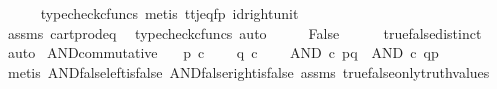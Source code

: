 \begin{isabellebody}
\ \ \ \ \isamarkupfalse%
\ {\isacharparenleft}{\kern0pt}typecheck{\isacharunderscore}{\kern0pt}cfuncs{\isacharcomma}{\kern0pt}\ metis\ tt{\isacharunderscore}{\kern0pt}j{\isacharunderscore}{\kern0pt}eq{\isacharunderscore}{\kern0pt}fp\ id{\isacharunderscore}{\kern0pt}right{\isacharunderscore}{\kern0pt}unit{}{\isacharparenright}{\kern0pt}\isanewline
\ \ \isamarkupfalse%
\ \isamarkupfalse%
\ {\isachardoublequoteopen}{\isasymt}\ {\isacharequal}{\kern0pt}\ {\isasymf}{\isachardoublequoteclose}\isanewline
\ \ \ \ \isamarkupfalse%
\ assms\ cart{\isacharunderscore}{\kern0pt}prod{\isacharunderscore}{\kern0pt}eq{}\ \isamarkupfalse%
\ {\isacharparenleft}{\kern0pt}typecheck{\isacharunderscore}{\kern0pt}cfuncs{\isacharcomma}{\kern0pt}\ auto{\isacharparenright}{\kern0pt}\isanewline
\ \ \isamarkupfalse%
\ \isamarkupfalse%
\ {\isachardoublequoteopen}False{\isachardoublequoteclose}\isanewline
\ \ \ \ \isamarkupfalse%
\ true{\isacharunderscore}{\kern0pt}false{\isacharunderscore}{\kern0pt}distinct\ \isamarkupfalse%
\ auto\isanewline
{}\isamarkupfalse%
%
\endisatagproof
{\isafoldproof}%
%
\isadelimproof
\isanewline
%
\endisadelimproof
\isanewline
{}\isamarkupfalse%
\ AND{\isacharunderscore}{\kern0pt}commutative{\isacharcolon}{\kern0pt}\isanewline
\ \ \ {\isachardoublequoteopen}p\ {\isasymin}\isactrlsub c\ {\isasymOmega}{\isachardoublequoteclose}\isanewline
\ \ \ {\isachardoublequoteopen}q\ {\isasymin}\isactrlsub c\ {\isasymOmega}{\isachardoublequoteclose}\isanewline
\ \ \ {\isachardoublequoteopen}AND\ {\isasymcirc}\isactrlsub c\ {\isasymlangle}p{\isacharcomma}{\kern0pt}q{\isasymrangle}\ {\isacharequal}{\kern0pt}\ AND\ {\isasymcirc}\isactrlsub c\ {\isasymlangle}q{\isacharcomma}{\kern0pt}p{\isasymrangle}{\isachardoublequoteclose}\isanewline
%
\isadelimproof
\ \ %
\endisadelimproof
%
\isatagproof
{}\isamarkupfalse%
\ {\isacharparenleft}{\kern0pt}metis\ AND{\isacharunderscore}{\kern0pt}false{\isacharunderscore}{\kern0pt}left{\isacharunderscore}{\kern0pt}is{\isacharunderscore}{\kern0pt}false\ AND{\isacharunderscore}{\kern0pt}false{\isacharunderscore}{\kern0pt}right{\isacharunderscore}{\kern0pt}is{\isacharunderscore}{\kern0pt}false\ assms\ true{\isacharunderscore}{\kern0pt}false{\isacharunderscore}{\kern0pt}only{\isacharunderscore}{\kern0pt}truth{\isacharunderscore}{\kern0pt}values{\isacharparenright}{\kern0pt}%

\end{isabellebody}
